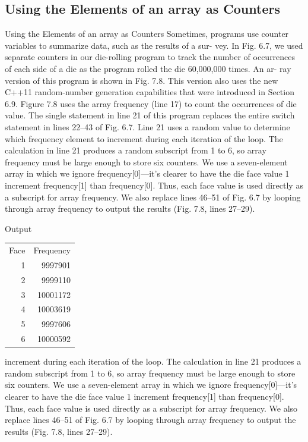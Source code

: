\documentclass[10pt]{beamer}
\begin{document}
\subsection{Using the Elements of an array as Counters}
\begin{frame}{Using the Elements of an array as Counters}
	Sometimes, programs use counter variables to summarize data, such as the results of a sur-
	vey. In Fig. 6.7, we used separate counters in our die-rolling program to track the number
	of occurrences of each side of a die as the program rolled the die 60,000,000 times. An ar-
	ray version of this program is shown in Fig. 7.8. This version also uses the new C++11
	random-number generation capabilities that were introduced in Section 6.9.
	Figure 7.8 uses the array frequency (line 17) to count the occurrences of die value.
	The single statement in line 21 of this program replaces the entire switch statement in lines
	22–43 of Fig. 6.7. Line 21 uses a random value to determine which frequency element to increment during each iteration of the loop. The calculation in line 21 produces a random
	subscript from 1 to 6, so array frequency must be large enough to store six counters. We
	use a seven-element array in which we ignore frequency[0]—it’s clearer to have the die
	face value 1 increment frequency[1] than frequency[0]. Thus, each face value is used
	directly as a subscript for array frequency. We also replace lines 46–51 of Fig. 6.7 by
	looping through array frequency to output the results (Fig. 7.8, lines 27–29).
\end{frame}

\begin{frame}
	
\end{frame}

\begin{frame}
	\begin{block}{\color{white}Output}
		\begin{tabular}{r r}
			Face & Frequency\\
			1 & 9997901\\
			2 & 9999110\\
			3 & 10001172\\
			4 & 10003619\\
			5 & 9997606\\
			6 & 10000592\\
		\end{tabular}
	\end{block}
increment during each iteration of the loop. The calculation in line 21 produces a random
subscript from 1 to 6, so array frequency must be large enough to store six counters. We
use a seven-element array in which we ignore frequency[0]—it’s clearer to have the die
face value 1 increment frequency[1] than frequency[0]. Thus, each face value is used
directly as a subscript for array frequency. We also replace lines 46–51 of Fig. 6.7 by
looping through array frequency to output the results (Fig. 7.8, lines 27–29).
\end{frame}
\end{document}

